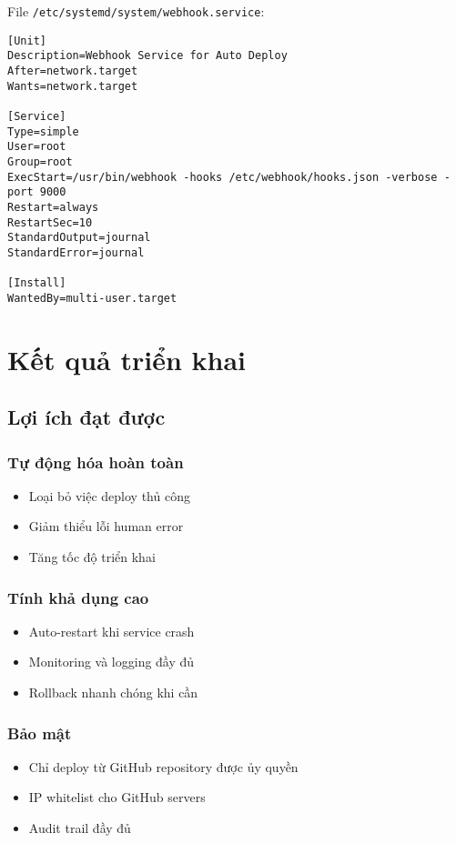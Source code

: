 \documentclass[12pt,a4paper]{article}
\begin{document}
File \texttt{/etc/systemd/system/webhook.service}:

\begin{lstlisting}[caption=Cấu hình systemd service]
[Unit]
Description=Webhook Service for Auto Deploy
After=network.target
Wants=network.target

[Service]
Type=simple
User=root
Group=root
ExecStart=/usr/bin/webhook -hooks /etc/webhook/hooks.json -verbose -port 9000
Restart=always
RestartSec=10
StandardOutput=journal
StandardError=journal

[Install]
WantedBy=multi-user.target
\end{lstlisting}

\section{Kết quả triển khai}

\subsection{Lợi ích đạt được}

\subsubsection{Tự động hóa hoàn toàn}
\begin{itemize}
    \item Loại bỏ việc deploy thủ công
    \item Giảm thiểu lỗi human error
    \item Tăng tốc độ triển khai
\end{itemize}

\subsubsection{Tính khả dụng cao}
\begin{itemize}
    \item Auto-restart khi service crash
    \item Monitoring và logging đầy đủ
    \item Rollback nhanh chóng khi cần
\end{itemize}

\subsubsection{Bảo mật}
\begin{itemize}
    \item Chỉ deploy từ GitHub repository được ủy quyền
    \item IP whitelist cho GitHub servers
    \item Audit trail đầy đủ
\end{itemize}
\end{document}
